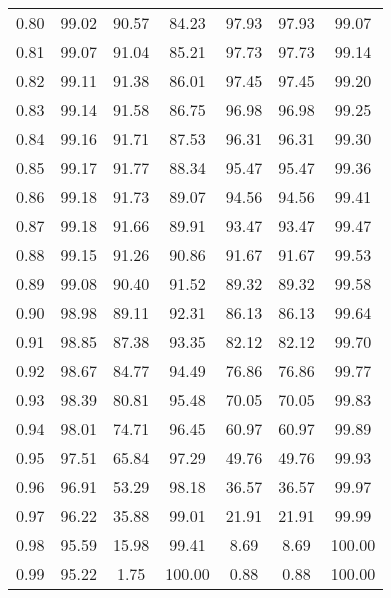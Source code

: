 \begin{tabular}{|c|c|c|c|c|c|c|}
      0.80 &     99.02 &     90.57 &      84.23 &   97.93 &      97.93 &         99.07 \\
      0.81 &     99.07 &     91.04 &      85.21 &   97.73 &      97.73 &         99.14 \\
      0.82 &     99.11 &     91.38 &      86.01 &   97.45 &      97.45 &         99.20 \\
      0.83 &     99.14 &     91.58 &      86.75 &   96.98 &      96.98 &         99.25 \\
      0.84 &     99.16 &     91.71 &      87.53 &   96.31 &      96.31 &         99.30 \\
      0.85 &     99.17 &     91.77 &      88.34 &   95.47 &      95.47 &         99.36 \\
      0.86 &     99.18 &     91.73 &      89.07 &   94.56 &      94.56 &         99.41 \\
      0.87 &     99.18 &     91.66 &      89.91 &   93.47 &      93.47 &         99.47 \\
      0.88 &     99.15 &     91.26 &      90.86 &   91.67 &      91.67 &         99.53 \\
      0.89 &     99.08 &     90.40 &      91.52 &   89.32 &      89.32 &         99.58 \\
      0.90 &     98.98 &     89.11 &      92.31 &   86.13 &      86.13 &         99.64 \\
      0.91 &     98.85 &     87.38 &      93.35 &   82.12 &      82.12 &         99.70 \\
      0.92 &     98.67 &     84.77 &      94.49 &   76.86 &      76.86 &         99.77 \\
      0.93 &     98.39 &     80.81 &      95.48 &   70.05 &      70.05 &         99.83 \\
      0.94 &     98.01 &     74.71 &      96.45 &   60.97 &      60.97 &         99.89 \\
      0.95 &     97.51 &     65.84 &      97.29 &   49.76 &      49.76 &         99.93 \\
      0.96 &     96.91 &     53.29 &      98.18 &   36.57 &      36.57 &         99.97 \\
      0.97 &     96.22 &     35.88 &      99.01 &   21.91 &      21.91 &         99.99 \\
      0.98 &     95.59 &     15.98 &      99.41 &    8.69 &       8.69 &        100.00 \\
      0.99 &     95.22 &      1.75 &     100.00 &    0.88 &       0.88 &        100.00 \\
\bottomrule
\end{tabular}
